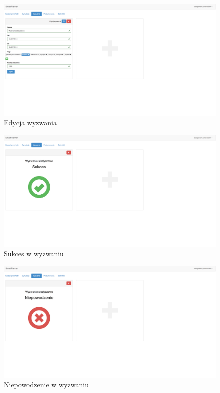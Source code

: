 \documentclass[10pt,titlepage]{article}
\begin{document}
\begin{figure}[H]
  \centering
  \includegraphics[scale=0.2]{images/screen_wyzwaniaEdycja.png}
  \caption{Edycja wyzwania}
\end{figure}
\begin{figure}[H]
  \centering
  \includegraphics[scale=0.2]{images/screen_wyzwaniaSukces.png}
  \caption{Sukces w wyzwaniu}
\end{figure}
\begin{figure}[H]
  \centering
  \includegraphics[scale=0.2]{images/screen_wyzwaniaNiepowodzenie.png}
  \caption{Niepowodzenie w wyzwaniu}
\end{figure}
\end{document}
